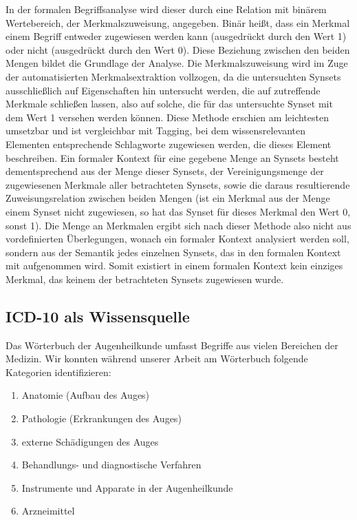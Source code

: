 \documentclass[pagesize,DIV=calc,12pt,draft]{scrreprt}
\begin{document}
In der formalen Begriffsanalyse wird dieser durch eine Relation mit binärem Wertebereich, der Merkmalszuweisung, angegeben. 
Binär heißt, dass ein Merkmal einem Begriff entweder zugewiesen werden kann (ausgedrückt durch den Wert 1) oder nicht (ausgedrückt durch den Wert 0). 
Diese Beziehung zwischen den beiden Mengen bildet die Grundlage der Analyse. 
Die Merkmalszuweisung wird im Zuge der automatisierten Merkmalsextraktion vollzogen, da die untersuchten Synsets ausschließlich auf Eigenschaften hin untersucht werden, die auf zutreffende Merkmale schließen lassen, also auf solche, die für das untersuchte Synset mit dem Wert 1 versehen werden können. 
Diese Methode erschien am leichtesten umsetzbar und ist vergleichbar mit Tagging, bei dem wissensrelevanten Elementen entsprechende Schlagworte zugewiesen werden, die dieses Element beschreiben. 
Ein formaler Kontext für eine gegebene Menge an Synsets besteht dementsprechend aus der Menge dieser Synsets, der Vereinigungsmenge der zugewiesenen Merkmale aller betrachteten Synsets, sowie die daraus resultierende Zuweisungsrelation zwischen beiden Mengen (ist ein Merkmal aus der Menge einem Synset nicht zugewiesen, so hat das Synset für dieses Merkmal den Wert 0, sonst 1). 
Die Menge an Merkmalen ergibt sich nach dieser Methode also nicht aus vordefinierten Überlegungen, wonach ein formaler Kontext analysiert werden soll, sondern aus der Semantik jedes einzelnen Synsets, das in den formalen Kontext mit aufgenommen wird. 
Somit existiert in einem formalen Kontext kein einziges Merkmal, das keinem der betrachteten Synsets zugewiesen wurde. 

\subsection{ICD-10 als Wissensquelle}

Das Wörterbuch der Augenheilkunde umfasst Begriffe aus vielen Bereichen der Medizin. 
Wir konnten während unserer Arbeit am Wörterbuch folgende Kategorien identifizieren: 

\begin{enumerate}
\item
  Anatomie (Aufbau des Auges)
\item
  Pathologie (Erkrankungen des Auges)
\item
  externe Schädigungen des Auges
\item
  Behandlungs- und diagnostische Verfahren
\item
  Instrumente und Apparate in der Augenheilkunde
\item
  Arzneimittel
\end{enumerate}
\end{document}
